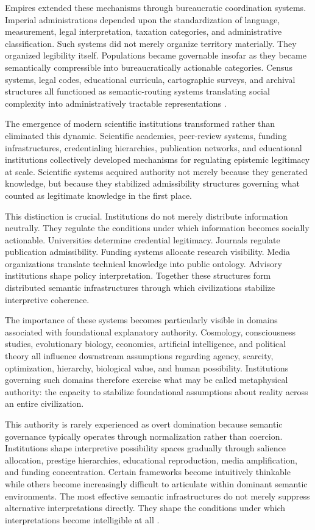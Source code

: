 \documentclass[11pt,a4paper]{article}
\begin{document}
Empires extended these mechanisms through bureaucratic coordination systems. Imperial administrations depended upon the standardization of language, measurement, legal interpretation, taxation categories, and administrative classification. Such systems did not merely organize territory materially. They organized legibility itself. Populations became governable insofar as they became semantically compressible into bureaucratically actionable categories. Census systems, legal codes, educational curricula, cartographic surveys, and archival structures all functioned as semantic-routing systems translating social complexity into administratively tractable representations \cite{scott1998}.

The emergence of modern scientific institutions transformed rather than eliminated this dynamic. Scientific academies, peer-review systems, funding infrastructures, credentialing hierarchies, publication networks, and educational institutions collectively developed mechanisms for regulating epistemic legitimacy at scale. Scientific systems acquired authority not merely because they generated knowledge, but because they stabilized admissibility structures governing what counted as legitimate knowledge in the first place.

This distinction is crucial. Institutions do not merely distribute information neutrally. They regulate the conditions under which information becomes socially actionable. Universities determine credential legitimacy. Journals regulate publication admissibility. Funding systems allocate research visibility. Media organizations translate technical knowledge into public ontology. Advisory institutions shape policy interpretation. Together these structures form distributed semantic infrastructures through which civilizations stabilize interpretive coherence.

The importance of these systems becomes particularly visible in domains associated with foundational explanatory authority. Cosmology, consciousness studies, evolutionary biology, economics, artificial intelligence, and political theory all influence downstream assumptions regarding agency, scarcity, optimization, hierarchy, biological value, and human possibility. Institutions governing such domains therefore exercise what may be called metaphysical authority: the capacity to stabilize foundational assumptions about reality across an entire civilization.

This authority is rarely experienced as overt domination because semantic governance typically operates through normalization rather than coercion. Institutions shape interpretive possibility spaces gradually through salience allocation, prestige hierarchies, educational reproduction, media amplification, and funding concentration. Certain frameworks become intuitively thinkable while others become increasingly difficult to articulate within dominant semantic environments. The most effective semantic infrastructures do not merely suppress alternative interpretations directly. They shape the conditions under which interpretations become intelligible at all \cite{foucault1980}.
\end{document}
